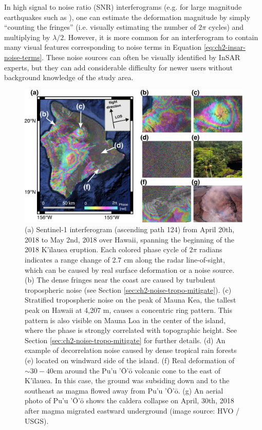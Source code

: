 In high signal to noise ratio (SNR) interferograms (e.g. for large magnitude earthquakes such as \cite{Massonnet1993DisplacementFieldLanders}), one can estimate the deformation magnitude by simply ``counting the fringes'' (i.e. visually estimating the number of $ 2 \pi $ cycles) and multiplying by $\lambda/2$. However, it is more common for an interferogram to contain many visual features corresponding to noise terms in Equation \eqref{eq:ch2-insar-noise-terms}. These noise sources can often be visually identified by InSAR experts, but they can add considerable difficulty for newer users without background knowledge of the study area.

\begin{figure}[!htbp]
	\centering
	\includegraphics[width=1.0\textwidth]{figures/chapter2-sar/hawaii-example-small.pdf}
	\caption[Sentinel-1 interferogram over Hawaii showing common noise sources, along with 2018 eruption deformation]{
		(a) Sentinel-1 interferogram (ascending path 124) from April 20th, 2018 to May 2nd, 2018 over Hawaii, spanning the beginning of the 2018 K'\=ilauea eruption.
		Each colored phase cycle of $2\pi$ radians indicates a range change of 2.7 cm along the radar line-of-sight, which can be caused by real surface deformation or a noise source.
		(b) The dense fringes near the coast are caused by turbulent tropospheric noise (see Section \ref{sec:ch2-noise-tropo-mitigate}).
		(c) Stratified tropospheric noise on the peak of Mauna Kea, the tallest peak on Hawaii at 4,207 m, causes a concentric ring pattern. This pattern is also visible on Mauna Loa in the center of the island, where the phase is strongly correlated with topographic height. See Section \ref{sec:ch2-noise-tropo-mitigate} for further details.
		(d) An example of decorrelation noise caused by dense tropical rain forests (e) located on windward side of the island.
		(f) Real deformation of $ \sim 30-40 $cm around the Pu'u '\=O'\=o volcanic cone to the east of K'\=ilauea. In this case, the ground was subsiding down and to the southeast as magma flowed away from Pu'u '\=O'\=o.
		(g) An aerial photo of Pu'u '\=O'\=o shows the caldera collapse on April, 30th, 2018 after magma migrated eastward underground (image source: HVO / USGS).
	}
	\label{fig:ch2-hawaii-example}
\end{figure}

